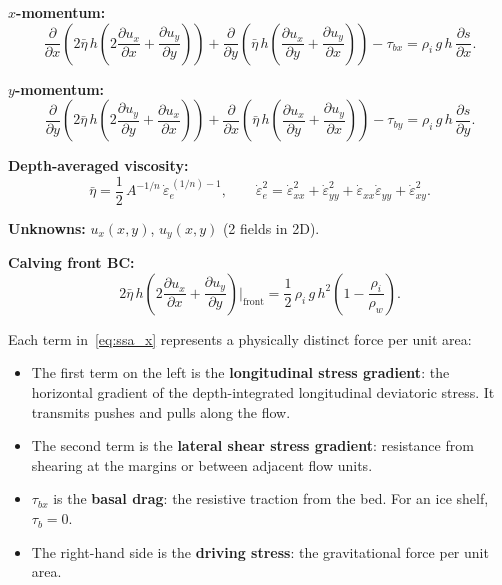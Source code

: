 \documentclass[11pt]{article}
\begin{document}
\begin{tcolorbox}[
  colback=green!5,
  colframe=green!50!black,
  title={\textbf{The Shallow Shelf Approximation (SSA)}},
  breakable
]
\textbf{$x$-momentum:}
\begin{equation}
  \frac{\partial}{\partial x}\!\left(2\bar{\eta}\,h\left(2\frac{\partial u_x}{\partial x} + \frac{\partial u_y}{\partial y}\right)\right)
  + \frac{\partial}{\partial y}\!\left(\bar{\eta}\,h\left(\frac{\partial u_x}{\partial y} + \frac{\partial u_y}{\partial x}\right)\right)
  - \tau_{bx}
  = \rho_i\,g\,h\,\frac{\partial s}{\partial x}.
  \label{eq:ssa_x}
\end{equation}

\textbf{$y$-momentum:}
\begin{equation}
  \frac{\partial}{\partial y}\!\left(2\bar{\eta}\,h\left(2\frac{\partial u_y}{\partial y} + \frac{\partial u_x}{\partial x}\right)\right)
  + \frac{\partial}{\partial x}\!\left(\bar{\eta}\,h\left(\frac{\partial u_x}{\partial y} + \frac{\partial u_y}{\partial x}\right)\right)
  - \tau_{by}
  = \rho_i\,g\,h\,\frac{\partial s}{\partial y}.
  \label{eq:ssa_y}
\end{equation}

\textbf{Depth-averaged viscosity:}
\begin{equation}
  \bar{\eta} = \frac{1}{2}\,A^{-1/n}\,\dot{\varepsilon}_e^{\,(1/n)-1}, \qquad
  \dot{\varepsilon}_e^2 = \dot{\varepsilon}_{xx}^2 + \dot{\varepsilon}_{yy}^2 + \dot{\varepsilon}_{xx}\dot{\varepsilon}_{yy} + \dot{\varepsilon}_{xy}^2.
\end{equation}

\textbf{Unknowns:} $u_x(x,y)$, $u_y(x,y)$ (2 fields in 2D).

\textbf{Calving front BC:}
\begin{equation}
  2\bar{\eta}\,h\left(2\frac{\partial u_x}{\partial x} + \frac{\partial u_y}{\partial y}\right)\bigg|_{\text{front}} = \frac{1}{2}\,\rho_i\,g\,h^2\left(1 - \frac{\rho_i}{\rho_w}\right).
  \label{eq:calving_front_ssa}
\end{equation}
\end{tcolorbox}

\noindent Each term in~\eqref{eq:ssa_x} represents a physically distinct force per unit area:
\begin{itemize}[nosep]
  \item The first term on the left is the \textbf{longitudinal stress gradient}: the horizontal gradient of the depth-integrated longitudinal deviatoric stress.  It transmits pushes and pulls along the flow.
  \item The second term is the \textbf{lateral shear stress gradient}: resistance from shearing at the margins or between adjacent flow units.
  \item $\tau_{bx}$ is the \textbf{basal drag}: the resistive traction from the bed.  For an ice shelf, $\tau_b = 0$.
  \item The right-hand side is the \textbf{driving stress}: the gravitational force per unit area.
\end{itemize}
\end{document}
